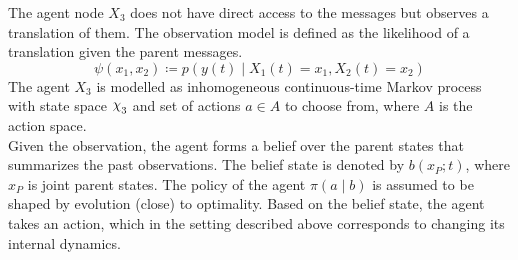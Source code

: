 The agent node $ X_3 $ does not have direct access to the messages but observes a translation of them. The observation model is defined as the likelihood of a translation given the parent messages.
\begin{equation}
\psi(x_1, x_2) \coloneqq p(y(t) \mid X_{1}(t)=x_1, X_{2}(t)=x_2)
\end{equation}
The agent  $ X_{3} $ is modelled as inhomogeneous continuous-time Markov process with state space $ \rchi_{3} $ and set of actions $ a \in A $ to choose from, where $ A $ is the action space. \\
Given the observation, the agent forms a belief over the parent states that summarizes the past observations. The belief state is denoted by $ b(x_P; t) $, where $ x_P $ is joint parent states. The policy of the agent $ \pi(a \mid b) $ is assumed to be shaped by evolution (close) to optimality. Based on the belief state, the agent takes an action, which in the setting described above corresponds to changing its internal dynamics. 

